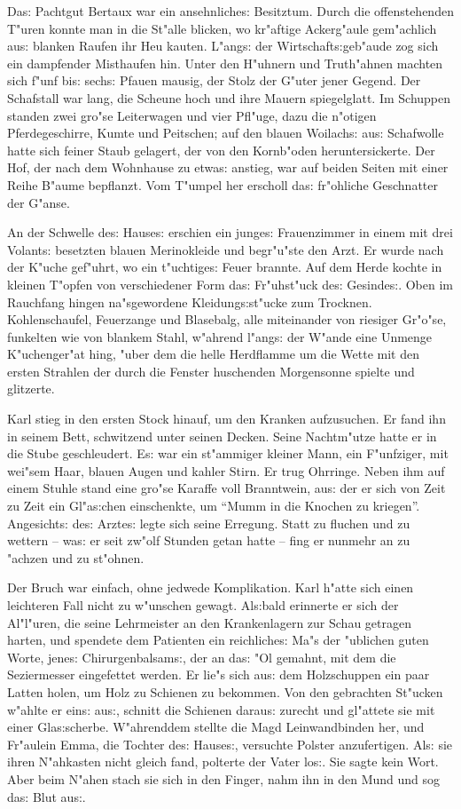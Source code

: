 \documentclass[oneside,12pt]{book}
\newcommand{\s}{s:}%
\begin{document}
Da{\s} Pachtgut Bertaux war ein ansehnliche{\s} Besitztum. Durch
die offenstehenden T"uren konnte man in die St"alle blicken, wo
kr"aftige Ackerg"aule gem"achlich au{\s} blanken Raufen ihr Heu
kauten. L"ang{\s} der Wirtschaft{\s}geb"aude zog sich ein
dampfender Misthaufen hin. Unter den H"uhnern und Truth"ahnen
machten sich f"unf bi{\s} sech{\s} Pfauen mausig, der Stolz der
G"uter jener Gegend. Der Schafstall war lang, die Scheune hoch und
ihre Mauern spiegelglatt. Im Schuppen standen zwei gro"se
Leiterwagen und vier Pfl"uge, dazu die n"otigen Pferdegeschirre,
Kumte und Peitschen; auf den blauen Woilach{\s} au{\s} Schafwolle
hatte sich feiner Staub gelagert, der von den Kornb"oden
heruntersickerte. Der Hof, der nach dem Wohnhause zu etwa{\s}
anstieg, war auf beiden Seiten mit einer Reihe B"aume bepflanzt.
Vom T"umpel her erscholl da{\s} fr"ohliche Geschnatter der G"anse.

An der Schwelle de{\s} Hause{\s} erschien ein junge{\s}
Frauenzimmer in einem mit drei Volant{\s} besetzten blauen
Merinokleide und begr"u"ste den Arzt. Er wurde nach der K"uche
gef"uhrt, wo ein t"uchtige{\s} Feuer brannte. Auf dem Herde kochte
in kleinen T"opfen von verschiedener Form da{\s} Fr"uhst"uck
de{\s} Gesinde{\s}. Oben im Rauchfang hingen na"sgewordene
Kleidung{\s}st"ucke zum Trocknen. Kohlenschaufel, Feuerzange und
Blasebalg, alle miteinander von riesiger Gr"o"se, funkelten wie
von blankem Stahl, w"ahrend l"ang{\s} der W"ande eine Unmenge
K"uchenger"at hing, "uber dem die helle Herdflamme um die Wette
mit den ersten Strahlen der durch die Fenster huschenden
Morgensonne spielte und glitzerte.

Karl stieg in den ersten Stock hinauf, um den Kranken aufzusuchen.
Er fand ihn in seinem Bett, schwitzend unter seinen Decken. Seine
Nachtm"utze hatte er in die Stube geschleudert. E{\s} war ein
st"ammiger kleiner Mann, ein F"unfziger, mit wei"sem Haar, blauen
Augen und kahler Stirn. Er trug Ohrringe. Neben ihm auf einem
Stuhle stand eine gro"se Karaffe voll Branntwein, au{\s} der er
sich von Zeit zu Zeit ein Gl"a{\s}chen einschenkte, um "`Mumm in
die Knochen zu kriegen"'. Angesicht{\s} de{\s} Arzte{\s} legte
sich seine Erregung. Statt zu fluchen und zu wettern -- wa{\s} er
seit zw"olf Stunden getan hatte -- fing er nunmehr an zu "achzen
und zu st"ohnen.

Der Bruch war einfach, ohne jedwede Komplikation. Karl h"atte sich
einen leichteren Fall nicht zu w"unschen gewagt. Al{\s}bald
erinnerte er sich der Al"l"uren, die seine Lehrmeister an den
Krankenlagern zur Schau getragen harten, und spendete dem
Patienten ein reichliche{\s} Ma"s der "ublichen guten Worte,
jene{\s} Chirurgenbalsam{\s}, der an da{\s} "Ol gemahnt, mit dem
die Seziermesser eingefettet werden. Er lie"s sich au{\s} dem
Holzschuppen ein paar Latten holen, um Holz zu Schienen zu
bekommen. Von den gebrachten St"ucken w"ahlte er ein{\s} au{\s},
schnitt die Schienen darau{\s} zurecht und gl"attete sie mit einer
Gla{\s}scherbe. W"ahrenddem stellte die Magd Leinwandbinden her,
und Fr"aulein Emma, die Tochter de{\s} Hause{\s}, versuchte
Polster anzufertigen. Al{\s} sie ihren N"ahkasten nicht gleich
fand, polterte der Vater lo{\s}. Sie sagte kein Wort. Aber beim
N"ahen stach sie sich in den Finger, nahm ihn in den Mund und sog
da{\s} Blut au{\s}.
\end{document}
